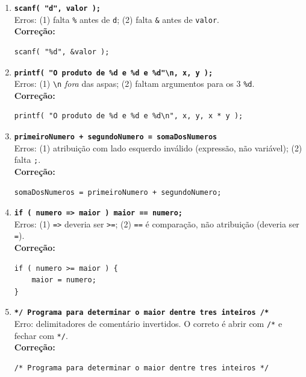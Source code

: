 \documentclass[12pt,a4paper]{article}
\begin{document}
\begin{respostabox}
\begin{enumerate}[label=\textbf{\alph*)}]

\item \textbf{\texttt{scanf( "d", valor );}}\\
Erros: (1) falta \texttt{\%} antes de \texttt{d}; (2) falta \texttt{\&} antes de \texttt{valor}.\\
\textbf{Correção:}
\begin{lstlisting}
scanf( "%d", &valor );
\end{lstlisting}

\item \textbf{\texttt{printf( "O produto de \%d e \%d e \%d"\textbackslash n, x, y );}}\\
Erros: (1) \texttt{\textbackslash n} \textit{fora} das aspas; (2) faltam argumentos
para os 3 \texttt{\%d}.\\
\textbf{Correção:}
\begin{lstlisting}
printf( "O produto de %d e %d e %d\n", x, y, x * y );
\end{lstlisting}

\item \textbf{\texttt{primeiroNumero + segundoNumero = somaDosNumeros}}\\
Erros: (1) atribuição com lado esquerdo inválido (expressão, não variável); (2) falta \texttt{;}.\\
\textbf{Correção:}
\begin{lstlisting}
somaDosNumeros = primeiroNumero + segundoNumero;
\end{lstlisting}

\item \textbf{\texttt{if ( numero => maior ) maior == numero;}}\\
Erros: (1) \texttt{=>} deveria ser \texttt{>=}; (2) \texttt{==} é comparação, não
atribuição (deveria ser \texttt{=}).\\
\textbf{Correção:}
\begin{lstlisting}
if ( numero >= maior ) {
    maior = numero;
}
\end{lstlisting}

\item \textbf{\texttt{*/ Programa para determinar o maior dentre tres inteiros /*}}\\
Erro: delimitadores de comentário invertidos. O correto é abrir com \texttt{/*}
e fechar com \texttt{*/}.\\
\textbf{Correção:}
\begin{lstlisting}
/* Programa para determinar o maior dentre tres inteiros */
\end{lstlisting}


\end{enumerate}
\end{respostabox}
\end{document}

